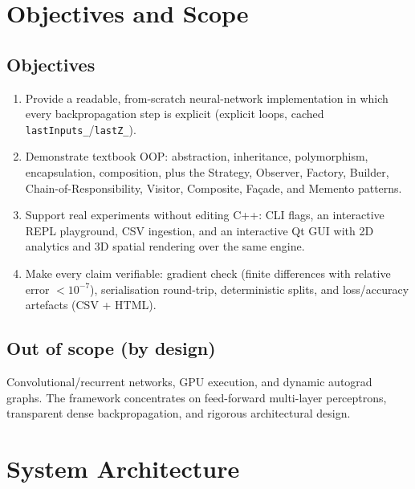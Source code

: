 \documentclass[11pt,a4paper]{article}
\begin{document}
\section{Objectives and Scope}

\subsection{Objectives}
\begin{enumerate}[itemsep=2pt]
    \item Provide a readable, from-scratch neural-network implementation in which every backpropagation step is explicit (explicit loops, cached \texttt{lastInputs\_}/\texttt{lastZ\_}).
    \item Demonstrate textbook OOP: abstraction, inheritance, polymorphism, encapsulation, composition, plus the Strategy, Observer, Factory, Builder, Chain-of-Responsibility, Visitor, Composite, Fa\c{c}ade, and Memento patterns.
    \item Support real experiments without editing C++: CLI flags, an interactive REPL playground, CSV ingestion, and an interactive Qt GUI with 2D analytics and 3D spatial rendering over the same engine.
    \item Make every claim verifiable: gradient check (finite differences with relative error $< 10^{-7}$), serialisation round-trip, deterministic splits, and loss/accuracy artefacts (CSV + HTML).
\end{enumerate}

\subsection{Out of scope (by design)}
Convolutional/recurrent networks, GPU execution, and dynamic autograd graphs. The framework concentrates on feed-forward multi-layer perceptrons, transparent dense backpropagation, and rigorous architectural design.

\section{System Architecture}
\end{document}
